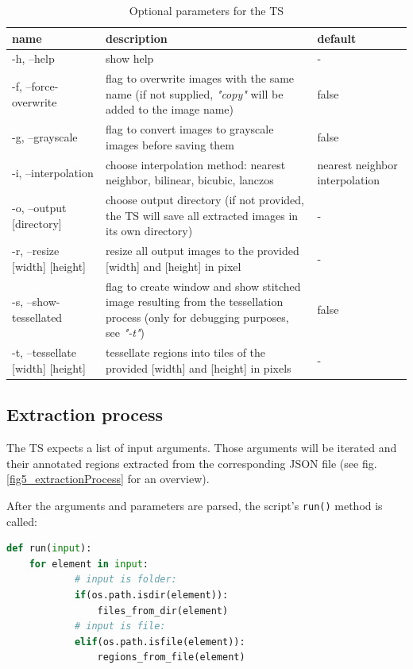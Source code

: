 \begin{table}[H]
	\begin{center}
		\begin{tabular}{| p{3cm} | p{5cm} | p{3cm} |}
			\hline
			\textbf{name} & \textbf{description} & \textbf{default}\\ \hline
			-h, --help & show help & - \\ \hline
			-f, --force-overwrite & flag to overwrite images with the same name (if not supplied, \emph{"{\textunderscore}copy"} will be added to the image name) & false \\ \hline
			-g, --grayscale & flag to convert images to grayscale images before saving them & false \\ \hline
			-i, --interpolation & choose interpolation method: nearest neighbor, bilinear, bicubic, lanczos  & nearest neighbor interpolation \\ \hline
			-o, --output [directory] & choose output directory (if not provided, the TS will save all extracted images in its own directory) & - \\ \hline
			-r, --resize [width] [height] & resize all output images to the provided [width] and [height] in pixel & - \\ \hline
			-s, --show-tessellated & flag to create window and show stitched image resulting from the tessellation process (only for debugging purposes, see \emph{"-t"}) & false\\ \hline
			-t, --tessellate [width] [height] & tessellate regions into tiles of the provided [width] and [height] in pixels & - \\ \hline
		\end{tabular}
		\caption{Optional parameters for the TS}
		\label{tab5_tsParams}
	\end{center}
\end{table}


\subsection{Extraction process}

The TS expects a list of input arguments. Those arguments will be iterated and their annotated regions extracted from the corresponding JSON file (see fig. \ref{fig5_extractionProcess} for an overview).

After the arguments and parameters are parsed, the script's \texttt{run()} method is called:

\begin{lstlisting}[frame=single, language=python, title=\texttt{run()} from TessellationService.py]
def run(input):
	for element in input:
			# input is folder:
			if(os.path.isdir(element)):
				files_from_dir(element)
			# input is file:
			elif(os.path.isfile(element)):
				regions_from_file(element)
\end{lstlisting}

